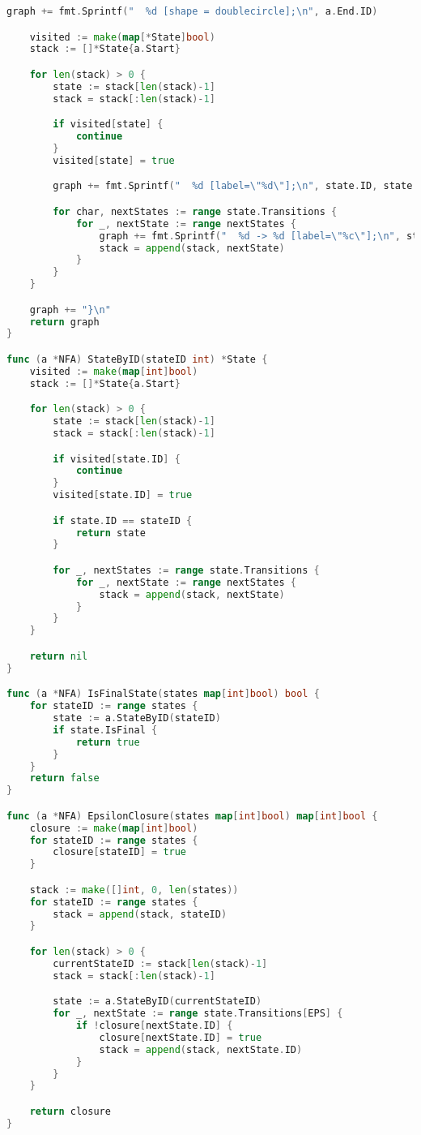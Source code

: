 \begin{lstlisting}[language=Go, caption={Код модуля \textit{nfa}}]
	graph += fmt.Sprintf("  %d [shape = doublecircle];\n", a.End.ID)

	visited := make(map[*State]bool)
	stack := []*State{a.Start}

	for len(stack) > 0 {
		state := stack[len(stack)-1]
		stack = stack[:len(stack)-1]

		if visited[state] {
			continue
		}
		visited[state] = true

		graph += fmt.Sprintf("  %d [label=\"%d\"];\n", state.ID, state.ID)

		for char, nextStates := range state.Transitions {
			for _, nextState := range nextStates {
				graph += fmt.Sprintf("  %d -> %d [label=\"%c\"];\n", state.ID, nextState.ID, char)
				stack = append(stack, nextState)
			}
		}
	}

	graph += "}\n"
	return graph
}

func (a *NFA) StateByID(stateID int) *State {
	visited := make(map[int]bool)
	stack := []*State{a.Start}

	for len(stack) > 0 {
		state := stack[len(stack)-1]
		stack = stack[:len(stack)-1]

		if visited[state.ID] {
			continue
		}
		visited[state.ID] = true

		if state.ID == stateID {
			return state
		}

		for _, nextStates := range state.Transitions {
			for _, nextState := range nextStates {
				stack = append(stack, nextState)
			}
		}
	}

	return nil
}

func (a *NFA) IsFinalState(states map[int]bool) bool {
	for stateID := range states {
		state := a.StateByID(stateID)
		if state.IsFinal {
			return true
		}
	}
	return false
}

func (a *NFA) EpsilonClosure(states map[int]bool) map[int]bool {
	closure := make(map[int]bool)
	for stateID := range states {
		closure[stateID] = true
	}

	stack := make([]int, 0, len(states))
	for stateID := range states {
		stack = append(stack, stateID)
	}

	for len(stack) > 0 {
		currentStateID := stack[len(stack)-1]
		stack = stack[:len(stack)-1]

		state := a.StateByID(currentStateID)
		for _, nextState := range state.Transitions[EPS] {
			if !closure[nextState.ID] {
				closure[nextState.ID] = true
				stack = append(stack, nextState.ID)
			}
		}
	}

	return closure
}
\end{lstlisting}

